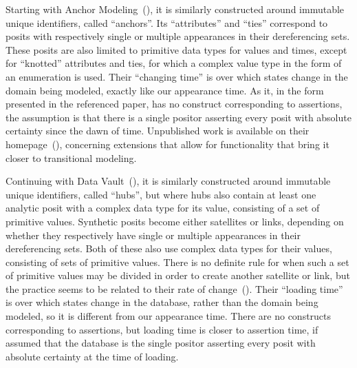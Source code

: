 \documentclass[sfsidenotes,nobib,twoside,symmetric]{tufte-handout}
\renewcommand{\parencite}[2][0pt]{(\citeauthor{#2})\sidenote[][#1]{\fullcite{#2}}}
\begin{document}
Starting with Anchor Modeling~\parencite{RonnbackEtAl}, it is similarly constructed around immutable unique identifiers, called \enquote{anchors}. Its \enquote{attributes} and \enquote{ties} correspond to posits with respectively single or multiple appearances in their dereferencing sets. These posits are also limited to primitive data types for values and times, except for \enquote{knotted} attributes and ties, for which a complex value type in the form of an enumeration is used. Their \enquote{changing time} is over which states change in the domain being modeled, exactly like our appearance time. As it, in the form presented in the referenced paper, has no construct corresponding to assertions, the assumption is that there is a single positor asserting every posit with absolute certainty since the dawn of time. Unpublished work is available on their homepage~\parencite[-5mm]{Anchor}, concerning extensions that allow for functionality that bring it closer to transitional modeling.

Continuing with Data Vault~\parencite{LinstedtEtAl}, it is similarly constructed around immutable unique identifiers, called \enquote{hubs}, but where hubs also contain at least one analytic posit with a complex data type for its value, consisting of a set of primitive values. Synthetic posits become either satellites or links, depending on whether they respectively have single or multiple appearances in their dereferencing sets. Both of these also use complex data types for their values, consisting of sets of primitive values. There is no definite rule for when such a set of primitive values may be divided in order to create another satellite or link, but the practice seems to be related to their rate of change~\parencite{Hultgren}. Their \enquote{loading time} is over which states change in the database, rather than the domain being modeled, so it is different from our appearance time. There are no constructs corresponding to assertions, but loading time is closer to assertion time, if assumed that the database is the single positor asserting every posit with absolute certainty at the time of loading. 
\end{document}
